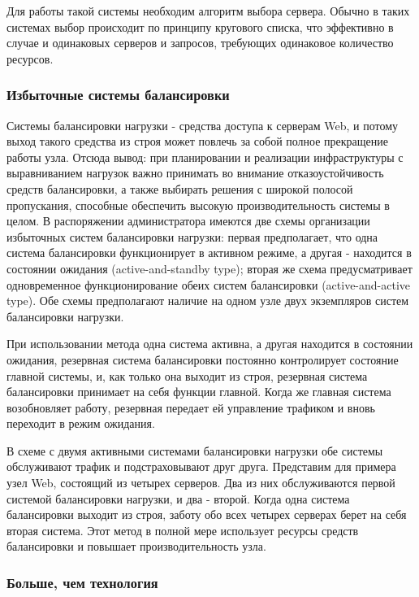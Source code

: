 Для работы такой системы необходим алгоритм выбора сервера. Обычно в таких системах выбор происходит по принципу кругового списка, что эффективно в случае и одинаковых серверов и запросов, требующих одинаковое количество ресурсов.

\subsubsection{Избыточные системы балансировки}

Системы балансировки нагрузки - средства доступа к серверам Web, и потому выход такого средства из строя может повлечь за собой полное прекращение работы узла. Отсюда вывод: при планировании и реализации инфраструктуры с выравниванием нагрузок важно принимать во внимание отказоустойчивость средств балансировки, а также выбирать решения с широкой полосой пропускания, способные обеспечить высокую производительность системы в целом. В распоряжении администратора имеются две схемы организации избыточных систем балансировки нагрузки: первая предполагает, что одна система балансировки функционирует в активном режиме, а другая - находится в состоянии ожидания (active-and-standby type); вторая же схема предусматривает одновременное функционирование обеих систем балансировки (active-and-active type). Обе схемы предполагают наличие на одном узле двух экземпляров систем балансировки нагрузки.

При использовании метода одна система активна, а другая находится в состоянии ожидания, резервная система балансировки постоянно контролирует состояние главной системы, и, как только она  выходит из строя,  резервная система балансировки принимает на себя функции главной. Когда же главная система возобновляет работу, резервная передает ей управление трафиком и вновь переходит в режим ожидания.

В схеме с двумя активными системами балансировки нагрузки обе системы обслуживают трафик и подстраховывают друг друга. Представим для примера узел Web, состоящий из четырех серверов. Два из них обслуживаются первой системой балансировки нагрузки, и два - второй. Когда одна система балансировки выходит из строя, заботу обо всех четырех серверах берет на себя вторая система. Этот метод в полной мере использует ресурсы средств балансировки и повышает производительность узла.

\subsubsection{Больше, чем технология}

